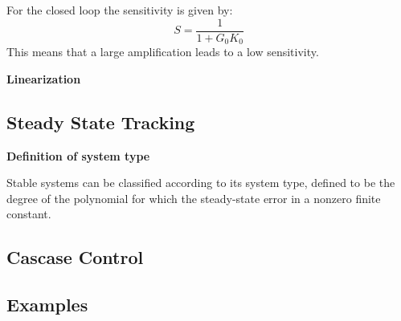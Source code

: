 For the closed loop the sensitivity is given by:
$$S = \frac{1}{1+G_0 K_0}$$
This means that a large amplification leads to a low sensitivity.

\textbf{Linearization}



\subsection{Steady State Tracking}

\textbf{Definition of system type}

Stable systems can be classified according to its system type, defined to be the degree of the polynomial
for which the steady-state error in a nonzero finite constant.


\subsection{Cascase Control}







\subsection{Examples}
